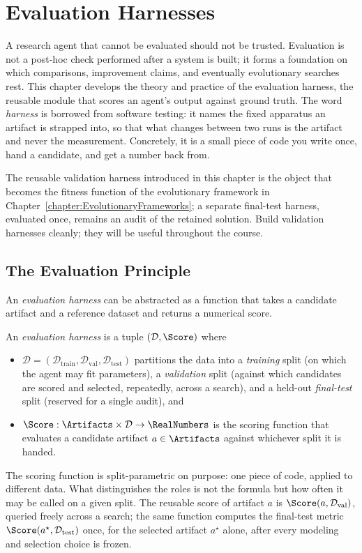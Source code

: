\chapter{Evaluation Harnesses}
\label{chapter:Evaluation}

A research agent that cannot be evaluated should not be trusted.
Evaluation is not a post-hoc check performed after a system is built; it forms a foundation on which comparisons, improvement claims, and eventually evolutionary searches rest.
This chapter develops the theory and practice of the evaluation harness, the reusable module that scores an agent's output against ground truth.
The word \emph{harness} is borrowed from software testing: it names the fixed apparatus an artifact is strapped into, so that what changes between two runs is the artifact and never the measurement.
Concretely, it is a small piece of code you write once, hand a candidate, and get a number back from.

The reusable validation harness introduced in this chapter is the object that becomes the fitness function of the evolutionary framework in Chapter~\ref{chapter:EvolutionaryFrameworks}; a separate final-test harness, evaluated once, remains an audit of the retained solution.
Build validation harnesses cleanly; they will be useful throughout the course.

\section{The Evaluation Principle}
\label{section:EvaluationPrinciple}

An \emph{evaluation harness} can be abstracted as a function that takes a candidate artifact and a reference dataset and returns a numerical score.
\begin{definition}
\label{definition:EvalHarness}
An \emph{evaluation harness} is a tuple $(\mathcal{D}, \Score)$ where
\begin{itemize}
\item $\mathcal{D} = (\mathcal{D}_{\mathrm{train}}, \mathcal{D}_{\mathrm{val}}, \mathcal{D}_{\mathrm{test}})$ partitions the data into a \emph{training} split (on which the agent may fit parameters), a \emph{validation} split (against which candidates are scored and selected, repeatedly, across a search), and a held-out \emph{final-test} split (reserved for a single audit), and
\item $\Score : \Artifacts \times \mathcal{D} \to \RealNumbers$ is the scoring function that evaluates a candidate artifact $a \in \Artifacts$ against whichever split it is handed.
\end{itemize}
The scoring function is split-parametric on purpose: one piece of code, applied to different data.
What distinguishes the roles is not the formula but how often it may be called on a given split.
The reusable score of artifact $a$ is $\Score(a, \mathcal{D}_{\mathrm{val}})$, queried freely across a search; the same function computes the final-test metric $\Score(a^{\star}, \mathcal{D}_{\mathrm{test}})$ once, for the selected artifact $a^{\star}$ alone, after every modeling and selection choice is frozen.
\end{definition}

